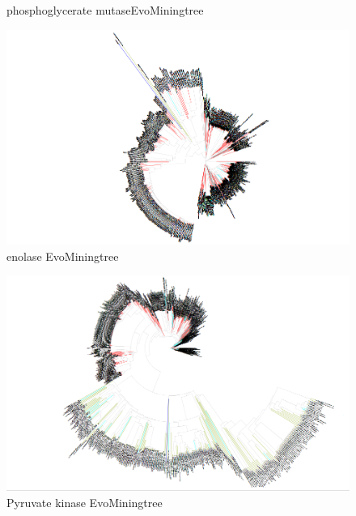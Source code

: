 \documentclass[12pt,twoside]{reedthesis}
\begin{document}
\begin{figure}[h!tbp]
  \caption[phosphoglycerate mutaseEvoMiningtree]{\normalsize{phosphoglycerate mutaseEvoMiningtree}}
  \label{fig:phosphoglycerate_mutase_evo_tree}
  \end{figure}\begin{figure}[h!tbp]
  \centering
  \includegraphics[angle = 180,scale = 0.25]{chapter2/Cyanobacteria/tree14.png}
  \caption[enolase EvoMiningtree]{\normalsize{enolase EvoMiningtree}}
  \label{fig:enolase_evo_tree}
  \end{figure}\begin{figure}[h!tbp]
  \centering
  \includegraphics[angle = 180,scale = 0.25]{chapter2/Cyanobacteria/tree15.png}
  \caption[Pyruvate kinase EvoMiningtree]{\normalsize{Pyruvate kinase EvoMiningtree}}
  \label{fig:Pyruvate_kinase_evo_tree}
  \end{figure}\begin{figure}[h!tbp]
  \centering

\end{figure}
\end{document}
